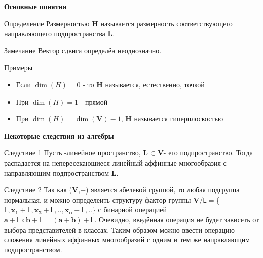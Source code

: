 \documentclass{beamer}
\begin{document}
\begin{frame}{\textbf{Основные понятия}}

\begin{block}{Определение}
Размерностью $\mathbf{H}$ называется размерность соответствующего направляющего подпространства $\mathbf{L}$.
\end{block}
\begin{block}{Замечание}
Вектор сдвига определён неоднозначно.
\end{block}
\begin{block}{Примеры}

\begin{itemize}
\item Если $\dim(H)=0$ - то $\mathbf{H}$ называется, естественно, точкой 
\item При $\dim(H)=1$ - прямой
\item При $\dim(H)=\dim(\mathbf{V})-1$, $\mathbf{H}$ называется гиперплоскостью
\end{itemize}

\end{block}

\end{frame}



\begin{frame}{\textbf{Некоторые следствия из алгебры}}


\begin{block}{Следствие 1}
Пусть -линейное пространство, $\mathbf{L}\subset \mathbf{V}$- его подпространство. Тогда  распадается на непересекающиеся линейный аффинные многообразия с направляющим подпространством $\mathbf{L}$.
\end{block}


\begin{block}{Следствие 2}
 Так как ($\mathbf{V}$,+) является абелевой группой, то любая подгруппа нормальная, и можно определеить структуру фактор-группы
 $\mathbf{V}/\mathsf{L}=$\{$\mathsf{L},\mathbf{x_1}+\mathsf{L},\mathbf{x_2}+\mathsf{L},..,\mathbf{x_n}+\mathsf{L},..$\} с бинарной операцией $\mathbf{a}+\mathsf{L}\circ \mathbf{b}+\mathsf{L}=(\mathbf{a}+\mathbf{b})+\mathsf{L}$. Очевидно, введённая операция не будет зависеть от выбора представителей в классах. Таким образом можно ввести операцию сложения линейных аффинных многообразий с одним и тем же направляющим подпространством.
\end{block}


\end{frame}
\end{document}
